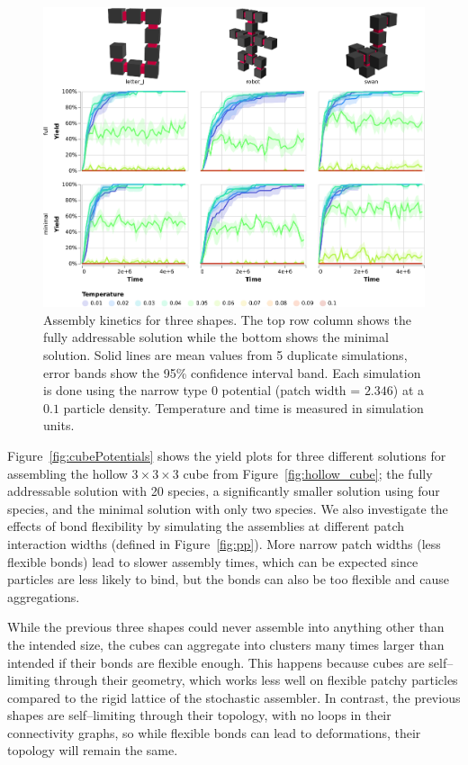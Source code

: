 \begin{figure}[h]
    \centering
    \includegraphics[width=\linewidth]{figures/patchysim/shapeKinetics.eps}
    \caption{Assembly kinetics for three shapes. The top row column shows the fully addressable solution while the bottom shows the minimal solution. Solid lines are mean values from 5 duplicate simulations, error bands show the 95\% confidence interval band. Each simulation is done using the narrow type \(0\) potential (patch width = \(2.346\)) at a \(0.1\) particle density. Temperature and time is measured in simulation units.}
    \label{fig:shapeKinetics}
\end{figure}

Figure~\ref{fig:cubePotentials} shows the yield plots for three different solutions for assembling the hollow \(3 \times 3 \times 3\) cube from Figure~\ref{fig:hollow_cube}; the fully addressable solution with 20 species, a significantly smaller solution using four species, and the minimal solution with only two species. We also investigate the effects of bond flexibility by simulating the assemblies at different patch interaction widths (defined in Figure~\ref{fig:pp}). More narrow patch widths (less flexible bonds) lead to slower assembly times, which can be expected since particles are less likely to bind, but the bonds can also be too flexible and cause aggregations.

While the previous three shapes could never assemble into anything other than the intended size, the cubes can aggregate into clusters many times larger than intended if their bonds are flexible enough. This happens because cubes are self--limiting through their geometry, which works less well on flexible patchy particles compared to the rigid lattice of the stochastic assembler. In contrast, the previous shapes are self--limiting through their topology, with no loops in their connectivity graphs, so while flexible bonds can lead to deformations, their topology will remain the same.


